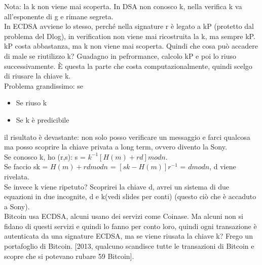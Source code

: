 \documentclass[16px]{article}
\begin{document}
Nota: la k non viene mai scoperta. In DSA non conosco k, nella verifica k va all'esponente di g e rimane segreta.\\ In ECDSA avviene lo stesso, perché nella signature r è legato a kP (protetto dal problema del Dlog), in verification non viene mai ricostruita la k, ma sempre kP.\\ kP costa abbastanza, ma k non viene mai scoperta. Quindi che cosa può accadere di male se riutilizzo k? Guadagno in pefrormance, calcolo kP e poi lo riuso successivamente. È questa la parte che costa computazionalmente, quindi scelgo di riusare la chiave k.\\ Problema grandissimo: se
\begin{itemize}
\item Se riuso k
\item Se k è predicibile
\end{itemize}
il risultato è devastante: non solo posso verificare un messaggio e farci qualcosa ma posso scoprire la chiave privata a long term, ovvero divento la Sony.\\ Se conosco k, ho (r,s): s = $k^{-1}[H(m) +rd]modn$.\\ Se faccio sk = $H(m) +rd modn$ = $[sk - H(m)]r^{-1}$ = $d modn$, d viene rivelata.\\ Se invece k viene ripetuto? Scoprirei la chiave d, avrei un sistema di due equazioni in due incognite, d e k(vedi slides per conti) (questo ciò che è accaduto a Sony).\\ Bitcoin usa ECDSA, alcuni usano dei servizi come Coinase. Ma alcuni non si fidano di questi servizi e quindi lo fanno per conto loro, quindi ogni transazione è autenticata da una signature ECDSA, ma se viene riusata la chiave k? Frego un portafoglio di Bitcoin. [2013, qualcuno scandisce tutte le transazioni di Bitcoin e scopre che si potevano rubare 59 Bitcoin].
\end{document}
